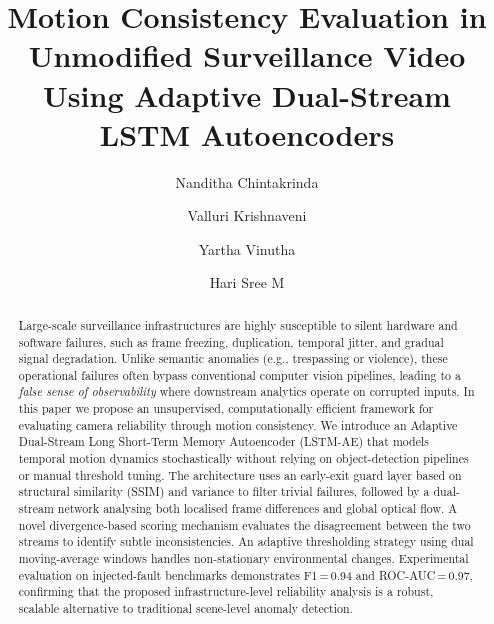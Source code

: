 \documentclass[runningheads]{llncs}
\begin{document}
\title{Motion Consistency Evaluation in Unmodified Surveillance Video
       Using Adaptive Dual-Stream LSTM Autoencoders}


\author{Nanditha Chintakrinda \and
        Valluri Krishnaveni \and
        Yartha Vinutha \and
        Hari Sree M}



\maketitle

\begin{abstract}
Large-scale surveillance infrastructures are highly susceptible to silent
hardware and software failures, such as frame freezing, duplication,
temporal jitter, and gradual signal degradation. Unlike semantic
anomalies (e.g., trespassing or violence), these operational failures
often bypass conventional computer vision pipelines, leading to a
\textit{false sense of observability} where downstream analytics operate
on corrupted inputs. In this paper we propose an unsupervised,
computationally efficient framework for evaluating camera reliability
through motion consistency. We introduce an Adaptive Dual-Stream Long
Short-Term Memory Autoencoder (LSTM-AE) that models temporal motion
dynamics stochastically without relying on object-detection pipelines or
manual threshold tuning. The architecture uses an early-exit guard layer
based on structural similarity (SSIM) and variance to filter trivial
failures, followed by a dual-stream network analysing both localised frame
differences and global optical flow. A novel divergence-based scoring
mechanism evaluates the disagreement between the two streams to identify
subtle inconsistencies. An adaptive thresholding strategy using dual
moving-average windows handles non-stationary environmental changes.
Experimental evaluation on injected-fault benchmarks demonstrates
F1\,=\,0.94 and ROC-AUC\,=\,0.97, confirming that the proposed
infrastructure-level reliability analysis is a robust, scalable
alternative to traditional scene-level anomaly detection.

\end{abstract}
\end{document}
